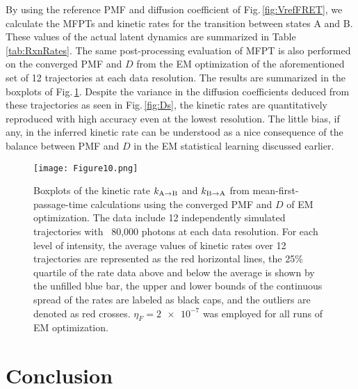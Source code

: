 \documentclass[journal=jpcbfk,manuscript=article,layout=twocolumn,articletitle=true]{achemso}
\begin{document}
By using the reference PMF and diffusion coefficient of Fig.\,\ref{fig:VrefFRET}, we calculate the MFPTs and kinetic rates for the transition between states A and B. These values of the actual latent dynamics are summarized in Table\,\ref{tab:RxnRates}. The same post-processing evaluation of MFPT is also performed on the converged PMF and $D$ from the EM optimization of the aforementioned set of 12 trajectories at each data resolution. The results are summarized in the boxplots of Fig.\,\ref{fig:Ks}. Despite the variance in the diffusion coefficients deduced from these trajectories as seen in Fig.\,\ref{fig:Ds}, the kinetic rates are quantitatively reproduced with high accuracy even at the lowest resolution. The little bias, if any, in the inferred kinetic rate can be understood as a nice consequence of the balance between PMF and $D$ in the EM statistical learning discussed earlier.


\begin{figure}[htpb]
\centering
\texttt{[image: Figure10.png]}
\caption[Kinetic rates from smFRET]{\label{fig:Ks} Boxplots of the kinetic rate $k_{{\rm A}\to {\rm B}}$ and $k_{{\rm B} \to {\rm A}}$ from mean-first-passage-time calculations using the converged PMF and $D$ of EM optimization. The data include 12 independently simulated trajectories with ~80,000 photons at each data resolution. For each level of intensity, the average values of kinetic rates over 12 trajectories are represented as the red horizontal lines, the 25\% quartile of the rate data above and below the average is shown by the unfilled blue bar, the upper and lower bounds of the continuous spread of the rates are labeled as black caps, and the outliers are denoted as red crosses. $\eta_F = \num{2e-7}$ was employed for all runs of EM optimization.}
\end{figure} 

\section{Conclusion}
\end{document}
